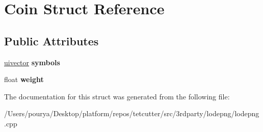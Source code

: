 \hypertarget{structCoin}{}\section{Coin Struct Reference}
\label{structCoin}
\subsection*{Public Attributes}
\begin{DoxyCompactItemize}
\item 
\hypertarget{structCoin_a1d6bc1176bb9fcbd9ca8c781c92ef432}{}\hyperlink{structuivector}{uivector} {\bfseries symbols}\label{structCoin_a1d6bc1176bb9fcbd9ca8c781c92ef432}

\item 
\hypertarget{structCoin_a0427f9a678a9ce031a254f40f06b3669}{}float {\bfseries weight}\label{structCoin_a0427f9a678a9ce031a254f40f06b3669}

\end{DoxyCompactItemize}


The documentation for this struct was generated from the following file\+:\begin{DoxyCompactItemize}
\item 
/\+Users/pourya/\+Desktop/platform/repos/tetcutter/src/3rdparty/lodepng/lodepng.\+cpp\end{DoxyCompactItemize}
